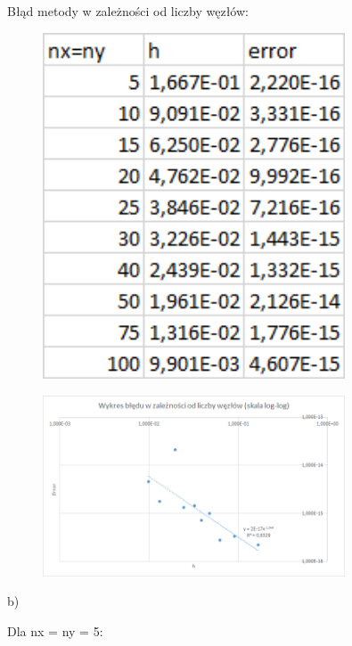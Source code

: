Błąd metody w zależności od liczby węzłów:

\begin{figure}[!ht]
	\begin{center}
		\includegraphics[width=0.8\textwidth]{Lab5/charts/zad1/error_dane.png}
	\end{center}
\end{figure}

\begin{figure}[!ht]
	\begin{center}
		\includegraphics[width=0.8\textwidth]{Lab5/charts/zad1/error.png}
	\end{center}
\end{figure}

\newpage

b)

Dla nx = ny = 5:

